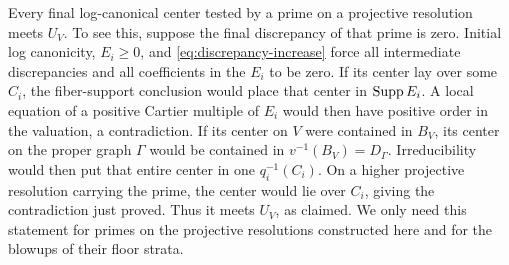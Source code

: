 Every final log-canonical center tested by a prime on a projective
resolution meets \(U_V\).  To see this, suppose the final discrepancy
of that prime is zero.  Initial log canonicity, \(E_i\geq0\), and
\eqref{eq:discrepancy-increase} force all intermediate discrepancies
and all coefficients in the \(E_i\) to be zero.  If its center lay over
some \(C_i\), the fiber-support conclusion would place that center in
\(\operatorname{Supp} E_i\).  A local equation of a positive Cartier multiple of
\(E_i\) would then have positive order in the valuation, a contradiction.
If its center on \(V\) were contained in \(B_V\), its center on the
proper graph \(\Gamma\) would be contained in
\(v^{-1}(B_V)=D_\Gamma\).  Irreducibility would then put that entire
center in one \(q_i^{-1}(C_i)\).  On a higher projective resolution
carrying the prime, the center would lie over \(C_i\), giving the
contradiction just proved.  Thus it meets
\(U_V\), as claimed.  We only need this statement for primes on the
projective resolutions constructed here and for the blowups of their
floor strata.

